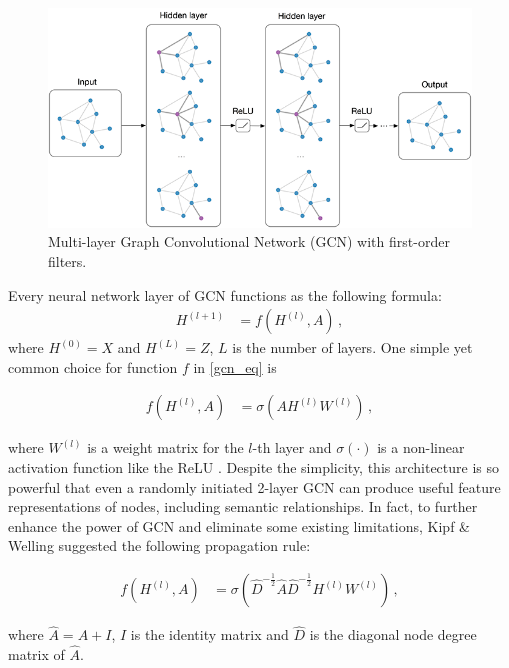 \begin{figure}
\centering
\includegraphics[scale=0.5]{charts/gcn_web.png}
\caption{Multi-layer Graph Convolutional Network (GCN) with first-order filters.}
\end{figure}

Every neural network layer of GCN functions as the following formula:
\begin{align}
H^{(l+1)} &= f(H^{(l)}, A)\,, \label{gcn_eq}
\end{align}
where $H^{(0)} = X$ and $H^{(L)} = Z$, $L$ is the number of layers. One simple yet common choice for function $f$ in \ref{gcn_eq} is 

\begin{align}
f(H^{(l)}, A) &= \sigma\left( AH^{(l)}W^{(l)}\right) \, ,
\end{align}

where $W^{(l)}$ is a weight matrix for the $l$-th layer and $\sigma(\cdot)$ is a non-linear activation function like the ReLU \cite{relu}. Despite the simplicity, this architecture is so powerful that even a randomly initiated 2-layer GCN can produce useful feature representations of nodes, including semantic relationships. In fact, to further enhance the power of GCN and eliminate some existing limitations,  Kipf \& Welling \cite{gcn} suggested the following propagation rule:

\begin{align}
f(H^{(l)}, A) &= \sigma\left( \hat{D}^{-\frac{1}{2}}\hat{A}\hat{D}^{-\frac{1}{2}}H^{(l)}W^{(l)}\right) \, ,
\end{align}

where $\hat{A} = A + I$, $I$ is the identity matrix and $\hat{D}$ is the diagonal node degree matrix of $\hat{A}$.




